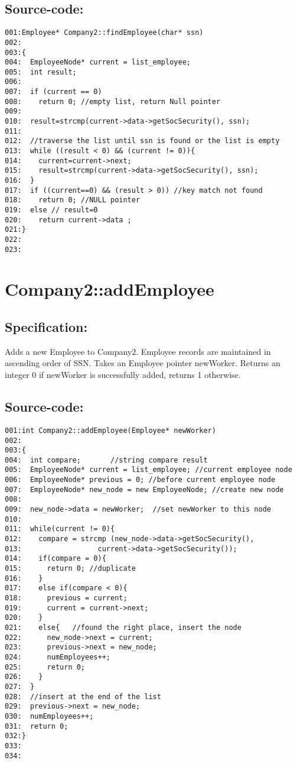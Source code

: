 \subsection*{Source-code:}
\begin{verbatim}
001:Employee* Company2::findEmployee(char* ssn)
002:         
003:{   
004:  EmployeeNode* current = list_employee;
005:  int result;
006:  
007:  if (current == 0)
008:    return 0; //empty list, return Null pointer
009:
010:  result=strcmp(current->data->getSocSecurity(), ssn);
011:
012:  //traverse the list until ssn is found or the list is empty
013:  while ((result < 0) && (current != 0)){
014:    current=current->next;
015:    result=strcmp(current->data->getSocSecurity(), ssn);
016:  }
017:  if ((current==0) && (result > 0)) //key match not found
018:    return 0; //NULL pointer
019:  else // result=0
020:    return current->data ; 
021:}
022:
023:
\end{verbatim}
\section{Company2::addEmployee}
\subsection*{Specification:}
Adds a new Employee to Company2.
  Employee records are maintained in ascending order of SSN.
  Takes an Employee pointer newWorker.
  Returns an integer 0 if newWorker is successfully added,
  returns 1 otherwise.
\subsection*{Source-code:}
\begin{verbatim}
001:int Company2::addEmployee(Employee* newWorker)
002:       
003:{
004:  int compare;       //string compare result
005:  EmployeeNode* current = list_employee; //current employee node
006:  EmployeeNode* previous = 0; //before current employee node
007:  EmployeeNode* new_node = new EmployeeNode; //create new node
008:
009:  new_node->data = newWorker;  //set newWorker to this node
010:  
011:  while(current != 0){
012:    compare = strcmp (new_node->data->getSocSecurity(),
013:                  current->data->getSocSecurity());
014:    if(compare = 0){
015:      return 0; //duplicate
016:    }
017:    else if(compare < 0){
018:      previous = current;
019:      current = current->next;
020:    }
021:    else{   //found the right place, insert the node 
022:      new_node->next = current; 
023:      previous->next = new_node;
024:      numEmployees++;
025:      return 0;
026:    }
027:  }
028:  //insert at the end of the list
029:  previous->next = new_node;
030:  numEmployees++;
031:  return 0;
032:}
033:
034:
\end{verbatim}

